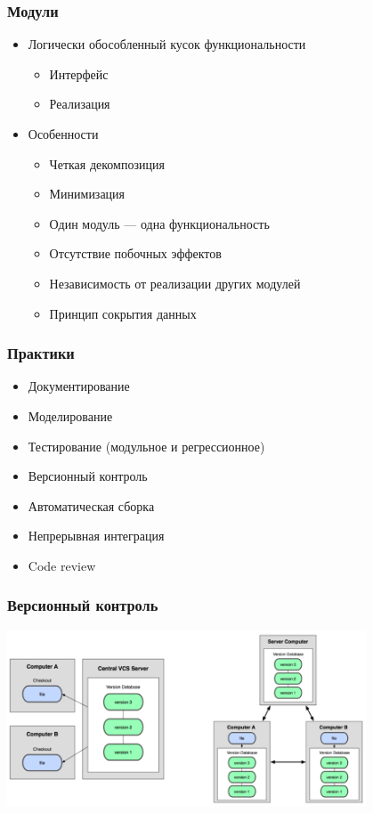\documentclass[xetex,mathserif,serif]{beamer}
\begin{document}
	\begin{frame}
		\frametitle{Модули}
		\begin{itemize}
			\item Логически обособленный кусок функциональности
			\begin{itemize}
				\item Интерфейс
				\item Реализация
			\end{itemize}
			\item Особенности
			\begin{itemize}
				\item Четкая декомпозиция
				\item Минимизация
				\item Один модуль --- одна функциональность
				\item Отсутствие побочных эффектов
				\item Независимость от реализации других модулей
				\item Принцип сокрытия данных
			\end{itemize}
		\end{itemize}
	\end{frame}

	\begin{frame}
		\frametitle{Практики}
		\begin{itemize}
			\item Документирование
			\item Моделирование
			\item Тестирование (модульное и регрессионное)
			\item Версионный контроль
			\item Автоматическая сборка
			\item Непрерывная интеграция
			\item Code review
		\end{itemize}
	\end{frame}

	\begin{frame}
		\frametitle{Версионный контроль}
		\begin{center}
			\includegraphics[width=0.8\textwidth]{version-control.png}
		\end{center}
	\end{frame}
\end{document}
